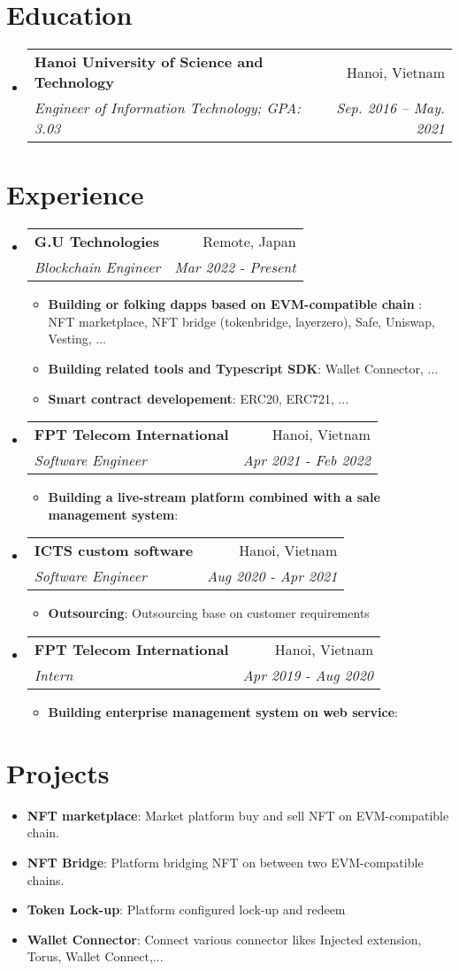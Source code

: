 \documentclass[letterpaper,11pt]{article}
\makeatletter
\newcommand{\resumeItem}[2]{
  \item\small{
    \textbf{#1}{: #2 \vspace{-2pt}}
  }
}
\newcommand{\resumeSubheading}[4]{
  \vspace{-1pt}\item
    \begin{tabular*}{0.97\textwidth}[t]{l@{\extracolsep{\fill}}r}
      \textbf{#1} & #2 \\
      \textit{\small#3} & \textit{\small #4} \\
    \end{tabular*}\vspace{-5pt}
}
\newcommand{\resumeSubItem}[2]{\resumeItem{#1}{#2}\vspace{-4pt}}
\newcommand{\resumeSubHeadingListStart}{\begin{itemize}[leftmargin=*]}
\newcommand{\resumeSubHeadingListEnd}{\end{itemize}}
\newcommand{\resumeItemListStart}{\begin{itemize}}
\newcommand{\resumeItemListEnd}{\end{itemize}\vspace{-5pt}}
\makeatother
\begin{document}
\section{Education}
  \resumeSubHeadingListStart
    \resumeSubheading
      {Hanoi University of Science and Technology}{Hanoi, Vietnam}
      {Engineer of Information Technology;  GPA: 3.03}{Sep. 2016 -- May. 2021}
  \resumeSubHeadingListEnd


\section{Experience}
  \resumeSubHeadingListStart

    \resumeSubheading
      {G.U Technologies}{Remote, Japan}
      {Blockchain Engineer}{Mar 2022 - Present}
      \resumeItemListStart
        \resumeItem{Building or folking dapps based on EVM-compatible chain }
        {NFT marketplace, NFT bridge (tokenbridge, layerzero), Safe, Uniswap, Vesting, ...}
        \resumeItem{Building related tools and Typescript SDK}
        {Wallet Connector, ...}
        \resumeItem{Smart contract developement}
        {ERC20, ERC721, ...}
      \resumeItemListEnd

    \resumeSubheading
      {FPT Telecom International}{Hanoi, Vietnam}
      {Software Engineer}{Apr 2021 - Feb 2022}
      \resumeItemListStart
        \resumeItem{Building a live-stream platform combined with a sale management system}
          {}
      \resumeItemListEnd

    \resumeSubheading
      {ICTS custom software}{Hanoi, Vietnam}
      {Software Engineer}{Aug 2020 - Apr 2021}
      \resumeItemListStart
        \resumeItem{Outsourcing}
          {Outsourcing base on customer requirements}
      \resumeItemListEnd

    \resumeSubheading
      {FPT Telecom International}{Hanoi, Vietnam}
      {Intern}{Apr 2019 - Aug 2020}
      \resumeItemListStart
        \resumeItem{Building enterprise management system on web service}
          {}
      \resumeItemListEnd

  \resumeSubHeadingListEnd


\section{Projects}
  \resumeSubHeadingListStart
    \resumeSubItem{NFT marketplace}
      {Market platform buy and sell NFT on EVM-compatible chain.}
    \resumeSubItem{NFT Bridge}
      {Platform bridging NFT on between two EVM-compatible chains.}
    \resumeSubItem{Token Lock-up}
      {Platform configured lock-up and redeem}
    \resumeSubItem{Wallet Connector}
      {Connect various connector likes Injected extension, Torus, Wallet Connect,...}
  \resumeSubHeadingListEnd
\end{document}
